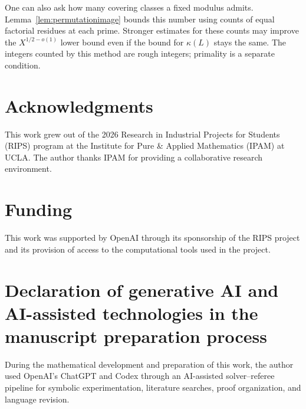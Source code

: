\documentclass[11pt]{amsart}
\theoremstyle{definition}
\theoremstyle{remark}
\begin{document}
One can also ask how many covering classes a fixed modulus admits.
Lemma~\ref{lem:permutationimage} bounds this number using counts of
equal factorial residues at each prime. Stronger estimates for these
counts may improve the $X^{1/2-o(1)}$ lower bound even if the bound for
$\kappa(L)$ stays the same. The integers counted by this method are
rough integers; primality is a separate condition.

\section*{Acknowledgments}

This work grew out of the 2026 Research in Industrial Projects for Students
(RIPS) program at the Institute for Pure \& Applied Mathematics (IPAM)
at UCLA. The author thanks IPAM for providing a collaborative research
environment.

\section*{Funding}

This work was supported by OpenAI through its sponsorship of the RIPS
project and its provision of access to the computational tools used in
the project.

\section*{Declaration of generative AI and AI-assisted technologies in
the manuscript preparation process}

During the mathematical development and preparation of this work, the
author used OpenAI's ChatGPT and Codex through an AI-assisted solver--referee
pipeline for symbolic experimentation, literature searches, proof
organization, and language revision.
\end{document}
